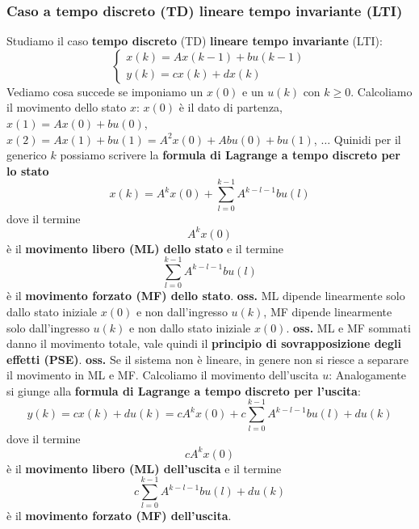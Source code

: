 \subsubsection{Caso a tempo discreto (TD) lineare tempo invariante (LTI)}
Studiamo il caso \textbf{tempo discreto} (TD) \textbf{lineare tempo invariante} (LTI):\newline
\[
    \begin{cases}
        x(k) = A x(k-1) + b u(k-1)\\
        y(k) = cx(k) + dx(k)
    \end{cases}
\]
Vediamo cosa succede se imponiamo un $x(0)$ e un $u(k)$ con $k\geq 0$.\newline
\newline
Calcoliamo il movimento dello stato $x$:\newline
$x(0)$ è il dato di partenza, \newline
$x(1) = Ax(0) + bu(0)$, \newline
$x(2) = A x(1) + bu(1) = A^2 x(0) + Abu(0) + bu(1)$,\newline
$\dots$\newline
Quinidi per il generico $k$ possiamo scrivere la \textbf{formula di Lagrange a tempo discreto per lo stato}
\[
    x(k) = A^kx(0) + \sum_{l=0}^{k-1}A^{k-l-1}bu(l)
\]
dove il termine
\[
    A^k x(0)
\]
è il \textbf{movimento libero (ML) dello stato} e il termine 
\[
    \sum_{l=0}^{k-1}A^{k-l-1}bu(l)
\]
è il \textbf{movimento forzato (MF) dello stato}.\newline
\newline
\textbf{oss.}  ML dipende linearmente solo dallo stato iniziale $x(0)$ e non dall'ingresso $u(k)$, MF dipende linearmente solo dall'ingresso $u(k)$ e non dallo stato iniziale $x(0)$.\newline
\newline
\textbf{oss.}  ML e MF sommati danno il movimento totale, vale quindi il \textbf{principio di sovrapposizione degli effetti (PSE)}.\newline
\newline
\textbf{oss.} Se il sistema non è lineare, in genere non si riesce a separare il movimento in ML e MF. \newline
\newline
Calcoliamo il movimento dell'uscita $u$:\newline
Analogamente si giunge alla \textbf{formula di Lagrange a tempo discreto per l'uscita}:
\[
    y(k) = cx(k) + du(k) = c A^k x(0) + c \sum_{l=0}^{k-1}A^{k-l-1}bu(l) + du(k)
\]
dove il termine
\[
    c A^k x(0)
\]
è il \textbf{movimento libero (ML) dell'uscita} e il termine
\[
    c \sum_{l=0}^{k-1}A^{k-l-1}bu(l) + du(k)
\]
è il \textbf{movimento forzato (MF) dell'uscita}.
